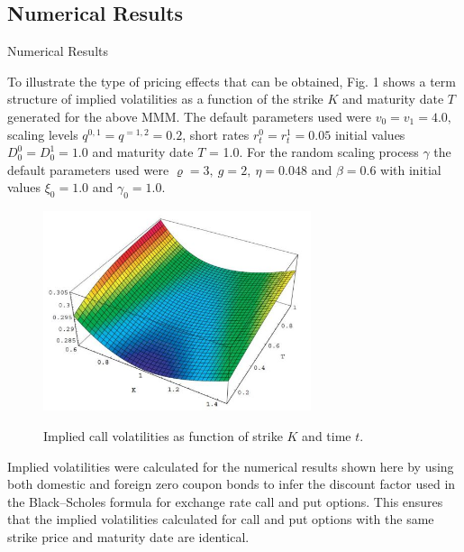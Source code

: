 \documentclass[unknownkeysallowed, compress]{beamer}
\theoremstyle{plain}
\begin{document}
\subsection{Numerical Results}%
\begin{frame}[allowframebreaks]{Numerical Results}%
\noindent
\par To illustrate the type of pricing effects that can be obtained, Fig. 1 shows a term
structure of implied volatilities as a function of the strike $K$ and maturity date $T$
generated for the above MMM. The default parameters used were $v_0 = v_1 =4.0,$\\
scaling levels $q^{0,1} = q^{=1,2} = 0.2$, short rates $r_t^0 = r_t^1 = 0.05$ initial values $D_0^0 = D_0^1 = 1.0$ and maturity date $T$ = 1.0. For the random scaling process $\gamma$ the default parameters used were $\varrho = 3,~g = 2,~\eta = 0.048$ and $\beta = 0.6$ with initial values $\xi_0 = 1.0$ and $\gamma_0 = 1.0.$


\begin{figure}[hp]
	\centering
		\includegraphics[width=0.70\textwidth]{fig1.JPG}
	\label{image1}
	\caption{Implied call volatilities as function of strike $K$ and time $t$.}
\end{figure}
Implied volatilities were calculated for the numerical results shown here by using both domestic and foreign zero coupon bonds to infer the discount factor used in the Black–Scholes formula for exchange rate call and put options. This ensures that the implied volatilities calculated for call and put options with the same strike price and maturity date are identical.\\


\end{frame}
\end{document}
